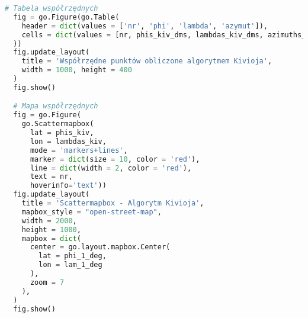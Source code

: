 \documentclass[fleqn,10pt,a4paper]{article}
\begin{document}
\begin{lstlisting}[language=Python, caption = Algorytm Kivioja, label = kod:kivioja, style = mycode]
  # Tabela współrzędnych
  fig = go.Figure(go.Table(
    header = dict(values = ['nr', 'phi', 'lambda', 'azymut']), 
    cells = dict(values = [nr, phis_kiv_dms, lambdas_kiv_dms, azimuths_kiv_dms])
  ))
  fig.update_layout(
    title = 'Współrzędne punktów obliczone algorytmem Kivioja', 
    width = 1000, height = 400
  )
  fig.show()

  # Mapa współrzędnych
  fig = go.Figure(
    go.Scattermapbox(
      lat = phis_kiv,
      lon = lambdas_kiv,
      mode = 'markers+lines',
      marker = dict(size = 10, color = 'red'),
      line = dict(width = 2, color = 'red'),
      text = nr,
      hoverinfo='text'))
  fig.update_layout(
    title = 'Scattermapbox - Algorytm Kivioja',
    mapbox_style = "open-street-map",
    width = 2000, 
    height = 1000,
    mapbox = dict(
      center = go.layout.mapbox.Center(
        lat = phi_1_deg,
        lon = lam_1_deg
      ),
      zoom = 7
    ),
  )
  fig.show()

\end{lstlisting}
\end{document}
